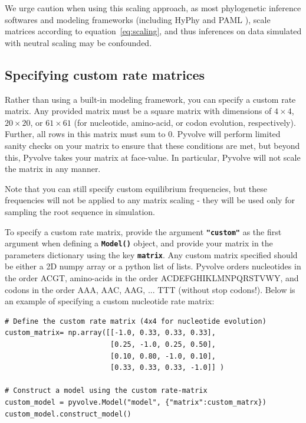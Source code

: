 \documentclass{article}
\newcommand{\code}[1]{\textbf{\texttt{\small{#1}}}}
\begin{document}
We urge caution when using this scaling approach, as most phylogenetic inference softwares and modeling frameworks (including HyPhy \citep{HYPHY} and PAML \citep{PAML}), scale matrices according to equation~\ref{eq:scaling}, and thus inferences on data simulated with neutral scaling may be confounded.


\subsection{Specifying custom rate matrices}\label{sec:custom}

Rather than using a built-in modeling framework, you can specify a custom rate matrix. Any provided matrix must be a square matrix with dimensions of $4\times4$, $20\times20$, or $61\times61$ (for nucleotide, amino-acid, or codon evolution, respectively). Further, all rows in this matrix must sum to 0. Pyvolve will perform limited sanity checks on your matrix to ensure that these conditions are met, but beyond this, Pyvolve takes your matrix at face-value. In particular, Pyvolve will not scale the matrix in any manner.

Note that you can still specify custom equilibrium frequencies, but these frequencies will not be applied to any matrix scaling - they will be used only for sampling the root sequence in simulation.

To specify a custom rate matrix, provide the argument \code{"custom"} as the first argument when defining a \code{Model()} object, and provide your matrix in the parameters dictionary using the key \code{matrix}. 
Any custom matrix specified should be either a 2D numpy array or a python list of lists. Pyvolve orders nucleotides in the order ACGT, amino-acids in the order ACDEFGHIKLMNPQRSTVWY, and codons in the order AAA, AAC, AAG, ... TTT (without stop codons!). Below is an example of specifying a custom nucleotide rate matrix:
\begin{lstlisting}
# Define the custom rate matrix (4x4 for nucleotide evolution)
custom_matrix= np.array([[-1.0, 0.33, 0.33, 0.33], 
                         [0.25, -1.0, 0.25, 0.50], 
                         [0.10, 0.80, -1.0, 0.10],
                         [0.33, 0.33, 0.33, -1.0]] )

# Construct a model using the custom rate-matrix
custom_model = pyvolve.Model("model", {"matrix":custom_matrx})
custom_model.construct_model()
\end{lstlisting}
\end{document}
